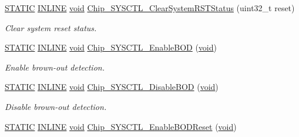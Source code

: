 \begin{DoxyCompactItemize}
\hyperlink{group__LPC__Types__Public__Macros_ga10b2d890d871e1489bb02b7e70d9bdfb}{S\-T\-A\-T\-I\-C} \hyperlink{group__LPC__Types__Public__Types_ga2eb6f9e0395b47b8d5e3eeae4fe0c116}{I\-N\-L\-I\-N\-E} \hyperlink{Paradigm_2Tern__EE_2small_2portmacro_8h_a14d32f8130d3c0b212cfc751730b5b49}{void} \hyperlink{group__SYSCTL__17XX__40XX_ga565050aac84c3cfa86874d42630d7eb8}{Chip\-\_\-\-S\-Y\-S\-C\-T\-L\-\_\-\-Clear\-System\-R\-S\-T\-Status} (uint32\-\_\-t reset)
\begin{DoxyCompactList}\small\item\em Clear system reset status. \end{DoxyCompactList}\item 
\hyperlink{group__LPC__Types__Public__Macros_ga10b2d890d871e1489bb02b7e70d9bdfb}{S\-T\-A\-T\-I\-C} \hyperlink{group__LPC__Types__Public__Types_ga2eb6f9e0395b47b8d5e3eeae4fe0c116}{I\-N\-L\-I\-N\-E} \hyperlink{Paradigm_2Tern__EE_2small_2portmacro_8h_a14d32f8130d3c0b212cfc751730b5b49}{void} \hyperlink{group__SYSCTL__17XX__40XX_ga68a4fd386020cb12d47b03f95903b9f1}{Chip\-\_\-\-S\-Y\-S\-C\-T\-L\-\_\-\-Enable\-B\-O\-D} (\hyperlink{Paradigm_2Tern__EE_2small_2portmacro_8h_a14d32f8130d3c0b212cfc751730b5b49}{void})
\begin{DoxyCompactList}\small\item\em Enable brown-\/out detection. \end{DoxyCompactList}\item 
\hyperlink{group__LPC__Types__Public__Macros_ga10b2d890d871e1489bb02b7e70d9bdfb}{S\-T\-A\-T\-I\-C} \hyperlink{group__LPC__Types__Public__Types_ga2eb6f9e0395b47b8d5e3eeae4fe0c116}{I\-N\-L\-I\-N\-E} \hyperlink{Paradigm_2Tern__EE_2small_2portmacro_8h_a14d32f8130d3c0b212cfc751730b5b49}{void} \hyperlink{group__SYSCTL__17XX__40XX_ga20468997a597d6fcae205472c22a949c}{Chip\-\_\-\-S\-Y\-S\-C\-T\-L\-\_\-\-Disable\-B\-O\-D} (\hyperlink{Paradigm_2Tern__EE_2small_2portmacro_8h_a14d32f8130d3c0b212cfc751730b5b49}{void})
\begin{DoxyCompactList}\small\item\em Disable brown-\/out detection. \end{DoxyCompactList}\item 
\hyperlink{group__LPC__Types__Public__Macros_ga10b2d890d871e1489bb02b7e70d9bdfb}{S\-T\-A\-T\-I\-C} \hyperlink{group__LPC__Types__Public__Types_ga2eb6f9e0395b47b8d5e3eeae4fe0c116}{I\-N\-L\-I\-N\-E} \hyperlink{Paradigm_2Tern__EE_2small_2portmacro_8h_a14d32f8130d3c0b212cfc751730b5b49}{void} \hyperlink{group__SYSCTL__17XX__40XX_ga4b04d78cf397ffd3980b2f4ded6a055d}{Chip\-\_\-\-S\-Y\-S\-C\-T\-L\-\_\-\-Enable\-B\-O\-D\-Reset} (\hyperlink{Paradigm_2Tern__EE_2small_2portmacro_8h_a14d32f8130d3c0b212cfc751730b5b49}{void})

\end{DoxyCompactItemize}
